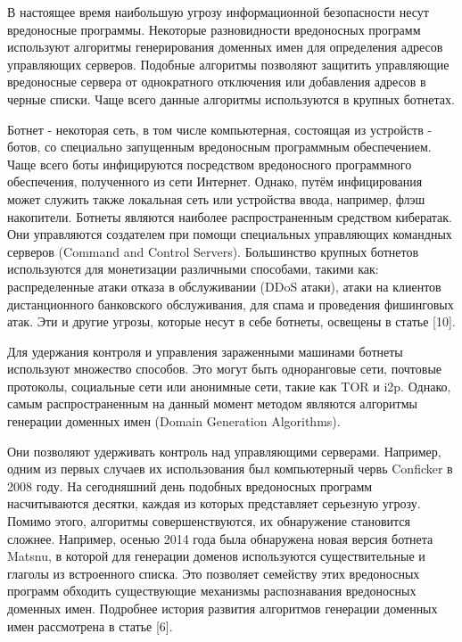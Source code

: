 
В настоящее время наибольшую угрозу информационной безопасности несут вредоносные программы. Некоторые разновидности вредоносных программ используют алгоритмы генерирования доменных имен для определения адресов управляющих серверов. Подобные алгоритмы позволяют защитить управляющие вредоносные сервера от однократного отключения или добавления адресов в черные списки. Чаще всего данные алгоритмы используются в крупных ботнетах. 

Ботнет - некоторая сеть, в том числе компьютерная, состоящая из устройств - ботов, со специально запущенным вредоносным программным обеспечением. Чаще всего боты инфицируются посредством вредоносного программного обеспечения, полученного из сети Интернет. Однако, путём инфицирования может служить также локальная сеть или устройства ввода, например, флэш накопители. Ботнеты являются наиболее распространенным средством кибератак. Они управляются создателем при помощи специальных управляющих командных серверов (Command and Control Servers). Большинство крупных ботнетов используются для монетизации различными способами, такими как: распределенные атаки отказа в обслуживании (DDoS атаки), атаки на клиентов дистанционного банковского обслуживания, для спама и проведения фишинговых атак. Эти и другие угрозы, которые несут в себе ботнеты, освещены в статье [10].

Для удержания контроля и управления зараженными машинами ботнеты используют множество способов. Это могут быть одноранговые сети, почтовые протоколы, социальные сети или анонимные сети, такие как TOR и i2p.
Однако, самым распространенным на данный момент методом являются алгоритмы генерации доменных имен (Domain Generation Algorithms).

Они позволяют удерживать контроль над управляющими серверами. Например, одним из первых случаев их использования был компьютерный червь Conficker в 2008 году. На сегодняшний день подобных вредоносных программ насчитываются десятки, каждая из которых представляет серьезную угрозу. Помимо этого, алгоритмы совершенствуются, их обнаружение становится сложнее. Например, осенью 2014 года была обнаружена новая версия ботнета Matsnu, в которой для генерации доменов используются существительные и глаголы из встроенного списка. Это позволяет семейству этих вредоносных программ обходить существующие механизмы распознавания вредоносных доменных имен. Подробнее история развития алгоритмов генерации доменных имен рассмотрена в статье [6].


